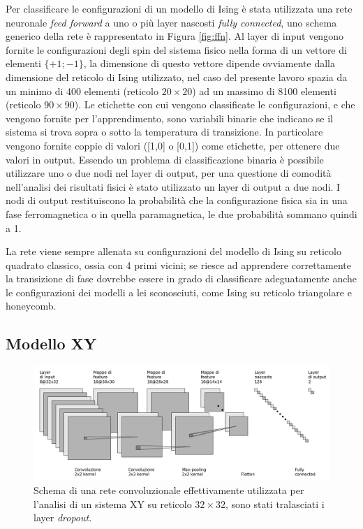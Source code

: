 \documentclass{article}
\begin{document}
Per classificare le configurazioni di un modello di Ising è stata utilizzata una rete neuronale \emph{feed forward} a uno o più layer nascosti \emph{fully connected}, uno schema generico della rete è rappresentato in Figura \ref{fig:ffn}.
Al layer di input vengono fornite le configurazioni degli spin del sistema fisico nella forma di un vettore di elementi $\{+1;-1\}$, la dimensione di questo vettore dipende ovviamente dalla dimensione del reticolo di Ising utilizzato, nel caso del presente lavoro spazia da un minimo di 400 elementi (reticolo $20\times20$) ad un massimo di 8100 elementi (reticolo $90\times90$).
Le etichette con cui vengono classificate le configurazioni, e che vengono fornite per l'apprendimento, sono variabili binarie che indicano se il sistema si trova sopra o sotto la temperatura di transizione.
In particolare vengono fornite coppie di valori ([1,0] o [0,1]) come etichette, per ottenere due valori in output.
Essendo un problema di classificazione binaria è possibile utilizzare uno o due nodi nel layer di output, per una questione di comodità nell'analisi dei risultati fisici è stato utilizzato un layer di output a due nodi.
I nodi di output restituiscono la probabilità che la configurazione fisica sia in una fase ferromagnetica o in quella paramagnetica, le due probabilità sommano quindi a 1.

La rete viene sempre allenata su configurazioni del modello di Ising su reticolo quadrato classico, ossia con 4 primi vicini; se riesce ad apprendere correttamente la transizione di fase dovrebbe essere in grado di classificare adeguatamente anche le configurazioni dei modelli a lei sconosciuti, come Ising su reticolo triangolare e honeycomb.

\subsection{Modello XY}
\label{sec:xy_learning}

\begin{figure}[ht]
 \centerline{\includegraphics[scale=0.35]{cnn.png}}
 \caption{Schema di una rete convoluzionale effettivamente utilizzata per l'analisi di un sistema XY su reticolo $32\times32$, sono stati tralasciati i layer \emph{dropout}.}
 \label{fig:cnn}
\end{figure}
\end{document}
